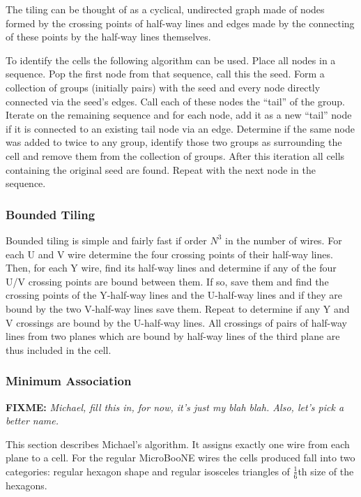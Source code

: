 \documentclass[letter]{article}
\newcommand\fixme[1]{\textbf{FIXME:} \textit{#1}\xspace}
\begin{document}
The tiling can be thought of as a cyclical, undirected graph made of
nodes formed by the crossing points of half-way lines and edges made
by the connecting of these points by the half-way lines themselves.

To identify the cells the following algorithm can be used.
Place all nodes in a sequence.
Pop the first node from that sequence, call this the seed.
Form a collection of groups (initially pairs) with the seed and every node directly
connected via the seed's edges.
Call each of these nodes the ``tail'' of the group.
Iterate on the remaining sequence and
for each node, add it as a new ``tail'' node if it is connected to an
existing tail node via an edge.
Determine if the same node was added to twice to any group,
identify those two groups as surrounding the cell and remove them from
the collection of groups.
After this iteration all cells containing the original seed are found.
Repeat with the next node in the sequence. 

\subsubsection{Bounded Tiling}

Bounded tiling is simple and fairly fast if order $N^3$ in the number
of wires.
For each U and V wire determine the four crossing points of their
half-way lines.
Then, for each Y wire, find its half-way lines and determine if any of
the four U/V crossing points are bound between them.
If so, save them and find the crossing points of the Y-half-way lines
and the U-half-way lines and if they are bound by the two V-half-way
lines save them.
Repeat to determine if any Y and V crossings are bound by the
U-half-way lines.
All crossings of pairs of half-way lines from two planes which are
bound by half-way lines of the third plane are thus included in the cell.


\subsubsection{Minimum Association}

\fixme{Michael, fill this in, for now, it's just my blah blah.
Also, let's pick a better name.}

This section describes Michael's algorithm.
It assigns exactly one wire from each plane to a cell.
For the regular MicroBooNE wires the cells produced fall into two
categories: regular hexagon shape and regular isosceles triangles of 
$\frac{1}{6}$th size of the hexagons.
\end{document}
